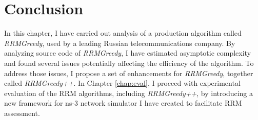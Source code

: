 \section{Conclusion}
\label{chap:research:sec:conclusion}
In this chapter, I have carried out analysis of a production algorithm called \textit{RRMGreedy}, used by a leading Russian telecommunications company. By analyzing source code of \textit{RRMGreedy}, I have estimated asymptotic complexity and found several issues potentially affecting the efficiency of the algorithm. To address those issues, I propose a set of enhancements for \textit{RRMGreedy}, together called \textit{RRMGreedy++}. In Chapter \ref{chap:eval}, I proceed with experimental evaluation of the RRM algorithms, including \textit{RRMGreedy++}, by introducing a new framework for ns-3 network simulator I have created to facilitate RRM assessment.